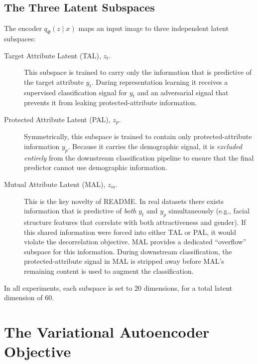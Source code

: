 \subsection{The Three Latent Subspaces}

The encoder $q_\Phi(z \mid x)$ maps an input image to three independent latent subspaces:

\begin{description}
    \item[Target Attribute Latent (TAL), $z_t$.]  This subspace is trained to carry only the
          information that is predictive of the target attribute $y_t$. During representation learning
          it receives a supervised classification signal for $y_t$ and an adversarial signal that
          prevents it from leaking protected-attribute information.

    \item[Protected Attribute Latent (PAL), $z_p$.]  Symmetrically, this subspace is trained to
          contain only protected-attribute information $y_p$. Because it carries the demographic
          signal, it is \emph{excluded entirely} from the downstream classification pipeline to ensure
          that the final predictor cannot use demographic information.

    \item[Mutual Attribute Latent (MAL), $z_m$.]  This is the key novelty of README. In real datasets
          there exists information that is predictive of \emph{both} $y_t$ and $y_p$ simultaneously
          (e.g., facial structure features that correlate with both attractiveness and gender). If this
          shared information were forced into either TAL or PAL, it would violate the decorrelation
          objective. MAL provides a dedicated ``overflow'' subspace for this information. During
          downstream classification, the protected-attribute signal in MAL is stripped away before
          MAL's remaining content is used to augment the classification.
\end{description}

In all experiments, each subspace is set to 20 dimensions, for a total latent dimension of 60.

\section{The Variational Autoencoder Objective}
\label{sec:readme-vae}


